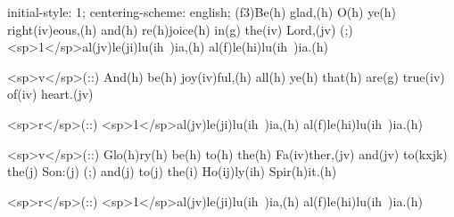 initial-style: 1;
centering-scheme: english;
(f3)Be(h) glad,(h) O(h) ye(h) right(iv)eous,(h) and(h) re(h)joice(h) in(g) the(iv) Lord,(jv) (;) <sp>1</sp>al(jv)le(ji)lu(ih~)ia,(h) al(f)le(hi)lu(ih~)ia.(h)

<sp>v</sp>(::) And(h) be(h) joy(iv)ful,(h) all(h) ye(h) that(h) are(g) true(iv) of(iv) heart.(jv)

<sp>r</sp>(::) <sp>1</sp>al(jv)le(ji)lu(ih~)ia,(h) al(f)le(hi)lu(ih~)ia.(h)

<sp>v</sp>(::) Glo(h)ry(h) be(h) to(h) the(h) Fa(iv)ther,(jv) and(jv) to(kxjk) the(j) Son:(j) (;) and(j) to(j) the(i) Ho(ij)ly(ih) Spir(h)it.(h)

<sp>r</sp>(::) <sp>1</sp>al(jv)le(ji)lu(ih~)ia,(h) al(f)le(hi)lu(ih~)ia.(h)
